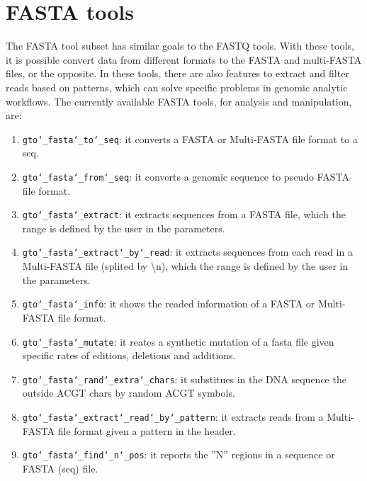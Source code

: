 \chapter{FASTA tools}
\label{fasta}
The FASTA tool subset has similar goals to the FASTQ tools. With these tools, it is possible convert data from different formats to the FASTA and multi-FASTA files, or the opposite. In these tools, there are also features to extract and filter reads based on patterns, which can solve specific problems in genomic analytic workflows. The currently available FASTA tools, for analysis and manipulation, are:
\begin{enumerate}

\item \texttt{gto\char`_fasta\char`_to\char`_seq}: it converts a FASTA or Multi-FASTA file format to a seq.

\item \texttt{gto\char`_fasta\char`_from\char`_seq}: it converts a genomic sequence to pseudo FASTA file format.

\item \texttt{gto\char`_fasta\char`_extract}: it extracts sequences from a FASTA file, which the range is defined by the user in the parameters.

\item \texttt{gto\char`_fasta\char`_extract\char`_by\char`_read}: it extracts sequences from each read in a Multi-FASTA file (splited by \textbackslash n), which the range is defined by the user in the parameters.

\item \texttt{gto\char`_fasta\char`_info}: it shows the readed information of a FASTA or Multi-FASTA file format.

\item \texttt{gto\char`_fasta\char`_mutate}: it reates a synthetic mutation of a fasta file given specific rates of editions, deletions and additions.

\item \texttt{gto\char`_fasta\char`_rand\char`_extra\char`_chars}: it substitues in the DNA sequence the outside ACGT chars by random ACGT symbols.

\item \texttt{gto\char`_fasta\char`_extract\char`_read\char`_by\char`_pattern}: it extracts reads from a Multi-FASTA file format given a pattern in the header.

\item \texttt{gto\char`_fasta\char`_find\char`_n\char`_pos}: it reports the ''N'' regions in a sequence or FASTA (seq) file.


\end{enumerate}

